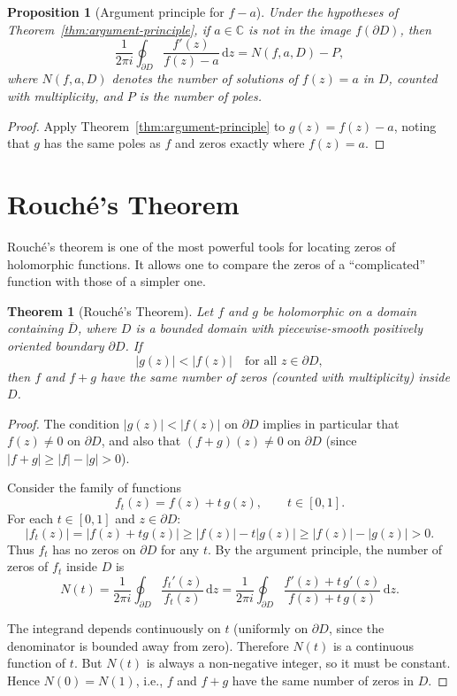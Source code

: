 \documentclass[12pt,a4paper,openany]{book}
\theoremstyle{definition}
\theoremstyle{plain}
\newtheorem{theorem}[definition]{Theorem}
\newtheorem{proposition}[definition]{Proposition}
\theoremstyle{remark}
\newcommand{\C}{\mathbb{C}}
\newcommand{\dd}{\mathrm{d}}
\newcommand{\abs}[1]{\left|#1\right|}
\begin{document}
\begin{proposition}[Argument principle for $f - a$]\label{prop:argument-principle-a}
Under the hypotheses of Theorem~\ref{thm:argument-principle}, if
$a \in \C$ is not in the image $f(\partial D)$, then
\[
  \frac{1}{2\pi i}\oint_{\partial D} \frac{f'(z)}{f(z) - a}\,\dd z
  = N(f, a, D) - P,
\]
where $N(f, a, D)$ denotes the number of solutions of $f(z) = a$ in $D$,
counted with multiplicity, and $P$ is the number of poles.
\end{proposition}

\begin{proof}
Apply Theorem~\ref{thm:argument-principle} to $g(z) = f(z) - a$,
noting that $g$ has the same poles as $f$ and zeros exactly where $f(z) = a$.
\end{proof}

\section{Rouch\'{e}'s Theorem}\label{sec:rouche}

Rouch\'{e}'s theorem is one of the most powerful tools for locating zeros
of holomorphic functions. It allows one to compare the zeros of a
``complicated'' function with those of a simpler one.

\begin{theorem}[Rouch\'{e}'s Theorem]\label{thm:rouche}
Let $f$ and $g$ be holomorphic on a domain containing $\overline{D}$,
where $D$ is a bounded domain with piecewise-smooth positively oriented
boundary $\partial D$. If
\begin{equation}\label{eq:rouche-condition}
  \abs{g(z)} < \abs{f(z)} \quad \text{for all } z \in \partial D,
\end{equation}
then $f$ and $f + g$ have the same number of zeros (counted with multiplicity)
inside $D$.
\end{theorem}

\begin{proof}
The condition $\abs{g(z)} < \abs{f(z)}$ on $\partial D$ implies in
particular that $f(z) \neq 0$ on $\partial D$, and also that
$(f+g)(z) \neq 0$ on $\partial D$ (since $\abs{f+g} \geq \abs{f} - \abs{g} > 0$).

Consider the family of functions
\[
  f_t(z) = f(z) + t\, g(z), \qquad t \in [0,1].
\]
For each $t \in [0,1]$ and $z \in \partial D$:
\[
  \abs{f_t(z)} = \abs{f(z) + tg(z)} \geq \abs{f(z)} - t\abs{g(z)}
  \geq \abs{f(z)} - \abs{g(z)} > 0.
\]
Thus $f_t$ has no zeros on $\partial D$ for any $t$. By the argument
principle, the number of zeros of $f_t$ inside $D$ is
\[
  N(t) = \frac{1}{2\pi i} \oint_{\partial D}
  \frac{f_t'(z)}{f_t(z)}\,\dd z
  = \frac{1}{2\pi i} \oint_{\partial D}
  \frac{f'(z) + t\, g'(z)}{f(z) + t\, g(z)}\,\dd z.
\]

The integrand depends continuously on $t$ (uniformly on $\partial D$,
since the denominator is bounded away from zero). Therefore $N(t)$ is
a continuous function of $t$. But $N(t)$ is always a non-negative
integer, so it must be constant. Hence
$N(0) = N(1)$, i.e., $f$ and $f + g$ have the same number of zeros
in $D$.
\end{proof}
\end{document}

